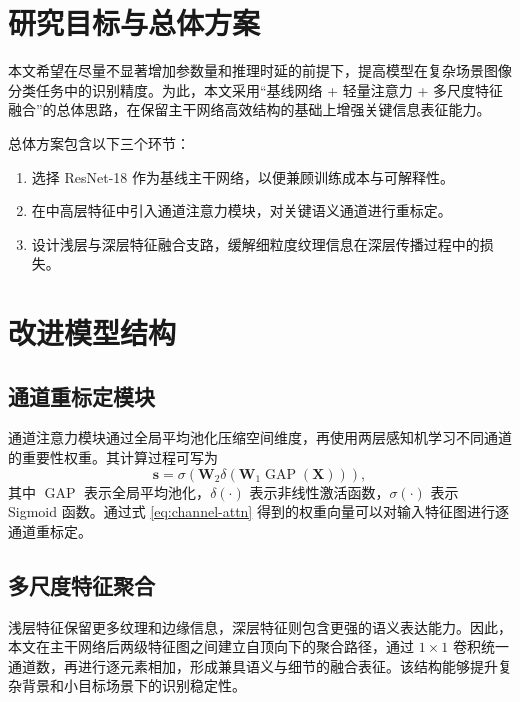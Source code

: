 \section{研究目标与总体方案}

本文希望在尽量不显著增加参数量和推理时延的前提下，提高模型在复杂场景图像分类任务中的识别精度。为此，本文采用“基线网络 + 轻量注意力 + 多尺度特征融合”的总体思路，在保留主干网络高效结构的基础上增强关键信息表征能力。

总体方案包含以下三个环节：

\begin{enumerate}
  \item 选择 ResNet-18 作为基线主干网络，以便兼顾训练成本与可解释性。
  \item 在中高层特征中引入通道注意力模块，对关键语义通道进行重标定。
  \item 设计浅层与深层特征融合支路，缓解细粒度纹理信息在深层传播过程中的损失。
\end{enumerate}

\section{改进模型结构}

\subsection{通道重标定模块}

通道注意力模块通过全局平均池化压缩空间维度，再使用两层感知机学习不同通道的重要性权重。其计算过程可写为
\begin{equation}
  \mathbf{s}=\sigma\left(\mathbf{W}_2\delta\left(\mathbf{W}_1\operatorname{GAP}(\mathbf{X})\right)\right),
  \label{eq:channel-attn}
\end{equation}
其中 $\operatorname{GAP}$ 表示全局平均池化，$\delta(\cdot)$ 表示非线性激活函数，$\sigma(\cdot)$ 表示 Sigmoid 函数。通过式 \eqref{eq:channel-attn} 得到的权重向量可以对输入特征图进行逐通道重标定。

\subsection{多尺度特征聚合}

浅层特征保留更多纹理和边缘信息，深层特征则包含更强的语义表达能力。因此，本文在主干网络后两级特征图之间建立自顶向下的聚合路径，通过 $1\times1$ 卷积统一通道数，再进行逐元素相加，形成兼具语义与细节的融合表征。该结构能够提升复杂背景和小目标场景下的识别稳定性。

